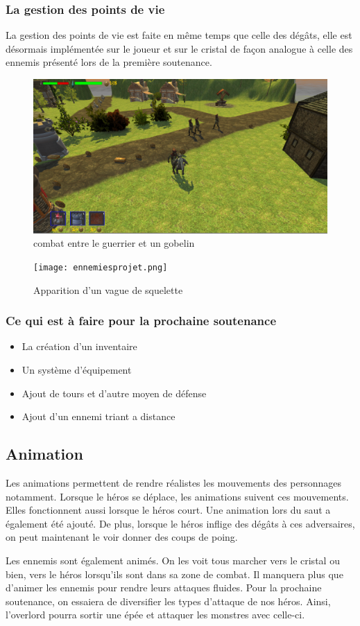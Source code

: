 \documentclass[a4paper, 12pt]{article}
\begin{document}
		\subsubsection{La gestion des points de vie}
La gestion des points de vie est faite en même temps que celle des dégâts, elle est désormais implémentée sur le joueur et sur le cristal de façon analogue à celle des ennemis présenté lors de la première soutenance.
	\begin{figure}[!ht]
		\centerline{\includegraphics[scale=0.3]{fight.png}}
		\caption*{combat entre le guerrier et un gobelin}
	\end{figure}
 
	\begin{figure}[!ht]
		\centerline{\texttt{[image: ennemiesprojet.png]}}
		\caption*{Apparition d'un vague de squelette}
	\end{figure}

	\subsubsection*{Ce qui est à faire pour la prochaine soutenance}	
	\begin{itemize}
	\item La création d'un inventaire
	\item Un système d'équipement
	\item Ajout de tours et d'autre moyen de d\'efense
	\item Ajout d'un ennemi triant a distance
	\end{itemize}

	\subsection{Animation}
		Les animations permettent de rendre réalistes les mouvements des personnages notamment. Lorsque le héros se déplace, les animations suivent ces mouvements. Elles fonctionnent aussi lorsque le héros court. Une animation lors du saut a également été ajouté. De plus, lorsque le héros inflige des dégâts à ces adversaires, on peut maintenant le voir donner des coups de poing. 
	\par Les ennemis sont également animés. On les voit tous marcher vers le cristal ou bien, vers le héros lorsqu’ils sont dans sa zone de combat.
Il manquera plus que d’animer les ennemis pour rendre leurs attaques fluides. Pour la prochaine soutenance, on essaiera de diversifier les types d’attaque de nos héros. Ainsi, l’overlord pourra sortir une épée et attaquer les monstres avec celle-ci.
\end{document}
